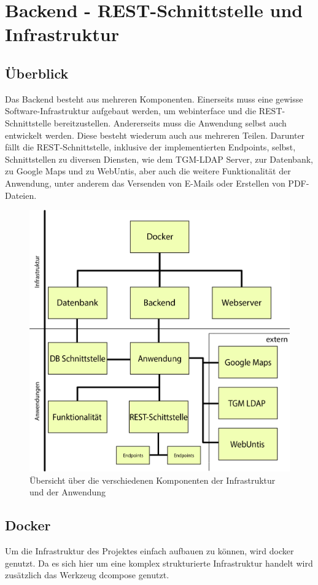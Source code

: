 \section{Backend - REST-Schnittstelle und Infrastruktur}
	\subsection{Überblick}
	Das Backend besteht aus mehreren Komponenten. Einerseits muss eine gewisse Software-Infrastruktur aufgebaut werden, um \Gls{webinterface} und die REST-Schnittstelle bereitzustellen. Andererseits muss die Anwendung selbst auch entwickelt werden. Diese besteht wiederum auch aus mehreren Teilen. Darunter fällt die REST-Schnittstelle, inklusive der implementierten Endpoints, selbst, Schnittstellen zu diversen Diensten, wie dem TGM-LDAP Server, zur Datenbank, zu Google Maps und zu WebUntis, aber auch die weitere Funktionalität der Anwendung, unter anderem das Versenden von E-Mails oder Erstellen von PDF-Dateien.
	\\
	\begin{figure}[H]
		\centering
		\includegraphics[width=0.8\linewidth]{images/uebersicht}
		\caption[Übersicht über die Komponenten]{Übersicht über die verschiedenen Komponenten der Infrastruktur und der Anwendung}
		\label{fig:uebersicht}
	\end{figure}
	
	\subsection{Docker}
	Um die Infrastruktur des Projektes einfach aufbauen zu können, wird \Gls{docker} genutzt. Da es sich hier um eine komplex strukturierte Infrastruktur handelt wird zusätzlich das Werkzeug \Gls{dcompose} genutzt.

